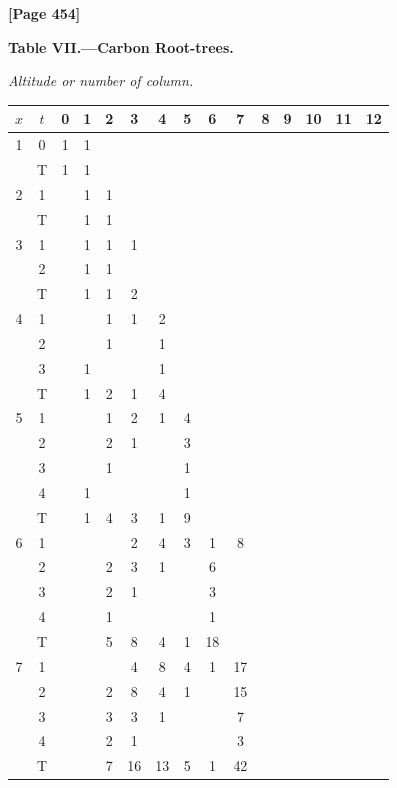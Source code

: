 \documentclass[11pt,a4paper]{book}
\begin{document}
\newpage
\textbf{[Page 454]}

\begin{center}
\textbf{Table VII.---Carbon Root-trees.}
\end{center}

\begin{small}
\textit{Altitude or number of column.}
\begin{center}
\begin{tabular}{|c|c|ccccccccccccc|}
\hline
$x$ & $t$ & 0 & 1 & 2 & 3 & 4 & 5 & 6 & 7 & 8 & 9 & 10 & 11 & 12 \\
\hline
1 & 0 & 1 & 1 & & & & & & & & & & & \\
  & T & 1 & 1 & & & & & & & & & & & \\
\hline
2 & 1 & & 1 & 1 & & & & & & & & & & \\
  & T & & 1 & 1 & & & & & & & & & & \\
\hline
3 & 1 & & 1 & 1 & 1 & & & & & & & & & \\
  & 2 & & 1 & 1 & & & & & & & & & & \\
  & T & & 1 & 1 & 2 & & & & & & & & & \\
\hline
4 & 1 & & & 1 & 1 & 2 & & & & & & & & \\
  & 2 & & & 1 & & 1 & & & & & & & & \\
  & 3 & & 1 & & & 1 & & & & & & & & \\
  & T & & 1 & 2 & 1 & 4 & & & & & & & & \\
\hline
5 & 1 & & & 1 & 2 & 1 & 4 & & & & & & & \\
  & 2 & & & 2 & 1 & & 3 & & & & & & & \\
  & 3 & & & 1 & & & 1 & & & & & & & \\
  & 4 & & 1 & & & & 1 & & & & & & & \\
  & T & & 1 & 4 & 3 & 1 & 9 & & & & & & & \\
\hline
6 & 1 & & & & 2 & 4 & 3 & 1 & 8 & & & & & \\
  & 2 & & & 2 & 3 & 1 & & 6 & & & & & & \\
  & 3 & & & 2 & 1 & & & 3 & & & & & & \\
  & 4 & & & 1 & & & & 1 & & & & & & \\
  & T & & & 5 & 8 & 4 & 1 & 18 & & & & & & \\
\hline
7 & 1 & & & & 4 & 8 & 4 & 1 & 17 & & & & & \\
  & 2 & & & 2 & 8 & 4 & 1 & & 15 & & & & & \\
  & 3 & & & 3 & 3 & 1 & & & 7 & & & & & \\
  & 4 & & & 2 & 1 & & & & 3 & & & & & \\
  & T & & & 7 & 16 & 13 & 5 & 1 & 42 & & & & & \\
\hline
\end{tabular}
\end{center}
\end{small}
\end{document}
